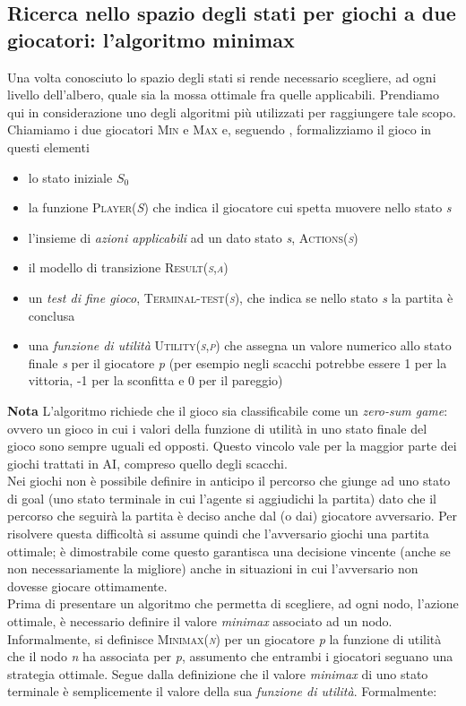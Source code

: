 \subsection{Ricerca nello spazio degli stati per giochi a due giocatori: l'algoritmo minimax}
Una volta conosciuto lo spazio degli stati si rende necessario scegliere, ad ogni livello dell'albero, quale sia la mossa ottimale fra quelle applicabili.
Prendiamo qui in considerazione uno degli algoritmi più utilizzati per raggiungere tale scopo.\\
Chiamiamo i due giocatori \textsc{Min} e \textsc{Max} e, seguendo \cite{randw}, formalizziamo il gioco in questi elementi
\begin{itemize}
   \item lo stato iniziale \emph{$S_0$} 
   \item la funzione \textsc{Player(\emph{S})} che indica il giocatore cui spetta muovere nello stato \emph{s}
   \item l'insieme di \emph{azioni applicabili} ad un dato stato \emph{s}, \textsc{Actions(\emph{s})}
   \item il modello di transizione \textsc{Result(\emph{s},\emph{a})}
   \item un \emph{test di fine gioco}, \textsc{Terminal-test(\emph{s})}, che indica se nello stato  \emph{s} la partita è conclusa
   \item una \emph{funzione di utilità} \textsc{Utility(\emph{s},\emph{p})} che assegna un valore numerico allo stato finale \emph{s} per il giocatore \emph{p} (per esempio negli scacchi potrebbe essere 1 per la vittoria, -1 per la sconfitta e 0 per il pareggio)
\end{itemize}

\textbf{Nota} L'algoritmo richiede che il gioco sia classificabile come un \emph{zero-sum game}: ovvero un gioco in cui i valori della funzione di utilità in uno stato finale del gioco sono sempre uguali ed opposti.
Questo vincolo vale per la maggior parte dei giochi trattati in AI, compreso quello degli scacchi.\\

Nei giochi non è possibile definire in anticipo il percorso che giunge ad uno stato di goal (uno stato terminale in cui l'agente si aggiudichi la partita) dato che il percorso che seguirà la partita è deciso anche dal (o dai) giocatore avversario.
Per risolvere questa difficoltà si assume quindi che l'avversario giochi una partita ottimale; è dimostrabile come questo garantisca una decisione vincente (anche se non necessariamente la migliore) anche in situazioni in cui l'avversario non dovesse giocare ottimamente.\\
Prima di presentare un algoritmo che permetta di scegliere, ad ogni nodo, l'azione ottimale, è necessario definire il valore \emph{minimax} associato ad un nodo.
Informalmente, si definisce \textsc{Minimax(\emph{n})} per un giocatore \emph{p }la funzione di utilità che il nodo \emph{n} ha associata per \emph{p}, assumento che entrambi i giocatori seguano una strategia ottimale.
Segue dalla definizione che il valore \emph{minimax} di uno stato terminale è semplicemente il valore della sua \emph{funzione di utilità}.
Formalmente:

